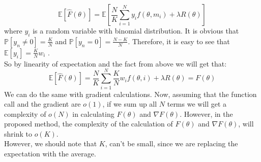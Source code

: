 \documentclass{article}
\begin{document}
\begin{enumerate}
    \begin{equation*}
        \mathbb{E}[ \hat{F}(\theta) ] = \mathbb{E} [\frac{N}{K} \sum_{i=1}^N  y_{i} f(\theta, m_i) + \lambda R(\theta) ]
    \end{equation*} where $y_i $ is a random variable with binomial distribution. It is obvious that $\mathbb{P} [y_n \neq 0] = \frac{K}{N}$ and $\mathbb{P} [y_n =0] = \frac{N-K}{N}$. Therefore, it is easy to see that $\mathbb{E} [y_i]  = \frac{K}{N} w_i $ .
    \\
    So by linearity of expectation and the fact from above we will get that:
    \begin{equation*}
    \mathbb{E}[ \hat{F}(\theta) ] = \frac{N}{K} \sum_{i=1}^N \frac{K}{N} w_{i} f(\theta, i) + \lambda R(\theta) = F(\theta) 
    \end{equation*}
    We can do the same with gradient calculations. Now, assuming that the function call and the gradient are $o(1)$, if we sum up all $N$ terms we will get a complexity of $o(N)$ in calculating $F(\theta)$ and $ \nabla F(\theta)$.
    However, in the proposed method, the complexity of the calculation of $F(\theta)$ and $ \nabla F(\theta)$, will shrink to $o(K)$. \\
    However, we should note that $K$, can't be small, since we are replacing the expectation with the average.
\end{enumerate}


\end{document}
